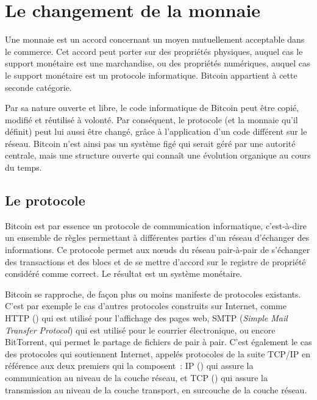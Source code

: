
\chapter{Le changement de la monnaie}
\label{ch:changement}

Une monnaie est un accord concernant un moyen mutuellement acceptable dans le commerce. Cet accord peut porter sur des propriétés physiques, auquel cas le support monétaire est une marchandise, ou des propriétés numériques, auquel cas le support monétaire est un protocole informatique. Bitcoin appartient à cette seconde catégorie.

Par sa nature ouverte et libre, le code informatique de Bitcoin peut être copié, modifié et réutilisé à volonté. Par conséquent, le protocole (et la monnaie qu'il définit) peut lui aussi être changé, grâce à l'application d'un code différent sur le réseau. Bitcoin n'est ainsi pas un système figé qui serait géré par une autorité centrale, mais une structure ouverte qui connaît une évolution organique au cours du temps.

\section*{Le protocole}

Bitcoin est par essence un protocole de communication informatique, c'est-à-dire un ensemble de règles permettant à différentes parties d'un réseau d'échanger des informations. Ce protocole permet aux nœuds du réseau pair-à-pair de s'échanger des transactions et des blocs et de se mettre d'accord sur le registre de propriété considéré comme correct. Le résultat est un système monétaire.

Bitcoin se rapproche, de façon plus ou moins manifeste de protocoles existants. C'est par exemple le cas d'autres protocoles construits sur Internet, comme HTTP () qui est utilisé pour l'affichage des pages web, SMTP (\emph{Simple Mail Transfer Protocol}) qui est utilisé pour le courrier électronique, ou encore BitTorrent, qui permet le partage de fichiers de pair à pair. C'est également le cas des protocoles qui soutiennent Internet, appelés protocoles de la suite TCP/IP en référence aux deux premiers qui la composent~: IP () qui assure la communication au niveau de la couche réseau, et TCP () qui assure la transmission au niveau de la couche transport, en surcouche de la couche réseau.

